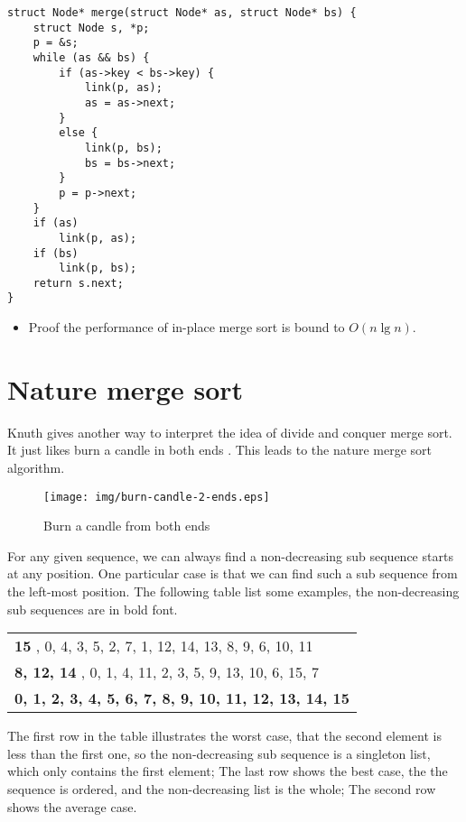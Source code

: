 \documentclass[UTF8]{article}
\begin{document}
\lstset{language=C}
\begin{lstlisting}
struct Node* merge(struct Node* as, struct Node* bs) {
    struct Node s, *p;
    p = &s;
    while (as && bs) {
        if (as->key < bs->key) {
            link(p, as);
            as = as->next;
        }
        else {
            link(p, bs);
            bs = bs->next;
        }
        p = p->next;
    }
    if (as)
        link(p, as);
    if (bs)
        link(p, bs);
    return s.next;
}
\end{lstlisting}

\begin{Exercise}
\begin{itemize}
\item Proof the performance of in-place merge sort is bound to $O(n \lg n)$.
\end{itemize}
\end{Exercise}

\section{Nature merge sort}
Knuth gives another way to interpret the idea of divide and conquer merge sort. It just likes
burn a candle in both ends \cite{TAOCP}. This leads to the nature merge sort algorithm.

\begin{figure}[htbp]
 \centering
 \texttt{[image: img/burn-candle-2-ends.eps]}
 \caption{Burn a candle from both ends}
 \label{fig:burn-candle}
\end{figure}

For any given sequence, we can always find a non-decreasing sub sequence starts at any position.
One particular case is that we can find such a sub sequence from the left-most position. The following
table list some examples, the non-decreasing sub sequences are in bold font.

\begin{tabular}{ | l |}
\hline
{\bf 15 } , 0, 4, 3, 5, 2, 7, 1, 12, 14, 13, 8, 9, 6, 10, 11 \\
{\bf 8, 12, 14 }, 0, 1, 4, 11, 2, 3, 5, 9, 13, 10, 6, 15, 7 \\
{\bf 0, 1, 2, 3, 4, 5, 6, 7, 8, 9, 10, 11, 12, 13, 14, 15 } \\
\hline
\end{tabular}

The first row in the table illustrates the worst case, that the second element is less than the first one,
so the non-decreasing sub sequence is a singleton list, which only contains the first element;
The last row shows the best case, the the sequence is ordered, and the non-decreasing list is the whole;
The second row shows the average case.
\end{document}
